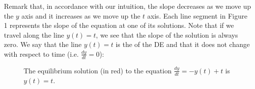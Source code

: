      Remark that, in accordance with our intuition, the slope decreases as we move up the $y$ axis and it increases as we move up the $t$ axis. Each line segment in Figure 1 represents the slope of the equation at one of its solutions. Note that if we travel along the line $y(t) = t$, we see that the slope of the solution is always zero. We say that the line $y(t) = t$ is the  of the DE and that it does not change with respect to time (i.e. $\frac{dy}{dt} = 0$):

    
     \begin{figure}[H]
        \centering
         \caption{The equilibrium solution (in red) to the equation $\frac{dy}{dt} = -y(t) + t$ is $y(t) = t$.}
     \end{figure}

